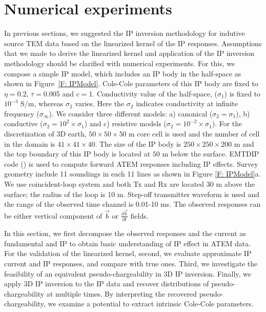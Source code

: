 \documentclass[a4paper, 11pt]{article}
\newcommand{\siginf}{\sigma_\infty}
\renewcommand {\b}  { {\vec b} }
\begin{document}

\section{Numerical experiments}
\label{section: numerical_examples}
In previous sections, we suggested the IP inversion methodology for indutive source TEM data based on the linearized kernel of the IP responses. 
Assumptions that we made to derive the linearized kernel and application of the IP inversion methodology should  be clarified with numerical experiments. 
For this, we compose a simple IP model, which includes an IP body in the half-space as shown in Figure~\ref{F: IPModel}.
Cole-Cole parameters of this IP body are fixed to $\eta=$0.2, $\tau=$0.005 and $c=$1.
Conductivity value of the half-space, ($\sigma_1$) is fixed to $10^{-3}$ S/m, whereas $\sigma_2$ varies. 
Here the $\sigma_2$ indicates conductivity at infinite frequency ($\siginf$). 
We consider three different models: a) canonical ($\sigma_2=\sigma_1$), b) conductive ($\sigma_2=10^2\times\sigma_1$) and c) resistive models ($\sigma_2=10^{-2}\times\sigma_1$).
For the discretization of 3D earth, $50\times50\times50$ m core cell is used and the number of cell in the domain is $41\times41\times40$.
The size of the IP body is $250\times250\times200$ m and the top boundary of this IP body is located at $50$ m below the surface.
EMTDIP code (\cite{Marchant2014}) is used to compute forward ATEM responses including IP effects. 
Survey geometry include 11 soundings in each 11 lines as shown in Figure \ref{F: IPModel}a.
We use coincident-loop system and both Tx and Rx are located 30 m above the surface; the radius of the loop is 10 m.
Step-off transmitter waveform is used and the range of the observed time channel is 0.01-10 ms.
The observed responses can be either vertical component of $\b$ or $\frac{\partial \b}{\partial t}$ fields.

In this section, we first decompose the observed responses and the current as fundamental and IP to obtain basic understanding of IP effect in ATEM data. 
For the validation of the linearized kernel, second, we evaluate approximate IP current and IP responses, and compare with true ones. 
Third, we investigate the feasibility of an equivalent pseudo-chargeability in 3D IP inversion. 
Finally, we apply 3D IP inversion to the IP data and recover distributions of pseudo-chargeability at multiple times.  By interpreting the recovered pseudo-chargeability, we examine a potential to extract intrinsic Cole-Cole parameters. 
\end{document}
